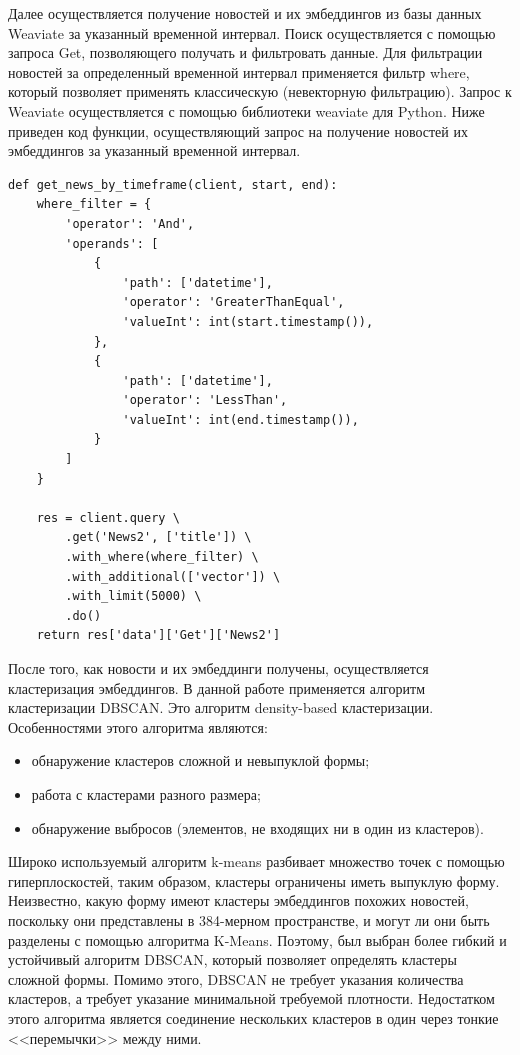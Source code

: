 Далее осуществляется получение новостей и их эмбеддингов из базы данных Weaviate за указанный временной интервал. Поиск осуществляется с помощью запроса Get{}, позволяющего получать и фильтровать данные. Для фильтрации новостей за определенный временной интервал применяется фильтр where, который позволяет применять классическую (невекторную фильтрацию). Запрос к Weaviate осуществляется с помощью библиотеки weaviate для Python. Ниже приведен код функции, осуществляющий запрос на получение новостей их эмбеддингов за указанный временной интервал.

\begin{lstlisting}
def get_news_by_timeframe(client, start, end):
    where_filter = {
        'operator': 'And',
        'operands': [
            {
                'path': ['datetime'],
                'operator': 'GreaterThanEqual',
                'valueInt': int(start.timestamp()),
            },
            {
                'path': ['datetime'],
                'operator': 'LessThan',
                'valueInt': int(end.timestamp()),
            }
        ]
    }

    res = client.query \
        .get('News2', ['title']) \
        .with_where(where_filter) \
        .with_additional(['vector']) \
        .with_limit(5000) \
        .do()
    return res['data']['Get']['News2']
\end{lstlisting}

После того, как новости и их эмбеддинги получены, осуществляется кластеризация эмбеддингов. В данной работе применяется алгоритм кластеризации DBSCAN. Это алгоритм density-based кластеризации. Особенностями этого алгоритма являются:
\begin{itemize}
    \item обнаружение кластеров сложной и невыпуклой формы;
    \item работа с кластерами разного размера;
    \item обнаружение выбросов (элементов, не входящих ни в один из кластеров).
\end{itemize}

Широко используемый алгоритм k-means разбивает множество точек с помощью гиперплоскостей, таким образом, кластеры ограничены иметь выпуклую форму. Неизвестно, какую форму имеют кластеры эмбеддингов похожих новостей, поскольку они представлены в 384-мерном пространстве, и могут ли они быть разделены с помощью алгоритма K-Means. Поэтому, был выбран более гибкий и устойчивый алгоритм DBSCAN, который позволяет определять кластеры сложной формы. Помимо этого, DBSCAN не требует указания количества кластеров, а требует указание минимальной требуемой плотности. Недостатком этого алгоритма является соединение нескольких кластеров в один через тонкие <<перемычки>> между ними.

